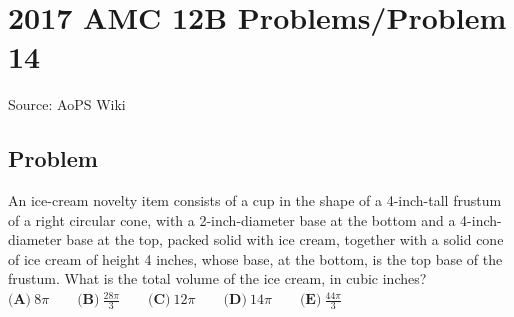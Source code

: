 \documentclass[12pt]{article}
\begin{document}
\section*{{2017 AMC 12B Problems/Problem 14}}
Source: AoPS Wiki

\subsection*{Problem}
An ice-cream novelty item consists of a cup in the shape of a 4-inch-tall frustum of a right circular cone, with a 2-inch-diameter base at the bottom and a 4-inch-diameter base at the top, packed solid with ice cream, together with a solid cone of ice cream of height 4 inches, whose base, at the bottom, is the top base of the frustum. What is the total volume of the ice cream, in cubic inches? $\textbf{(A)}\ 8\pi \qquad \textbf{(B)}\ \frac{28\pi}{3} \qquad \textbf{(C)}\ 12\pi \qquad \textbf{(D)}\ 14\pi \qquad \textbf{(E)}\ \frac{44\pi}{3}$
\end{document}
